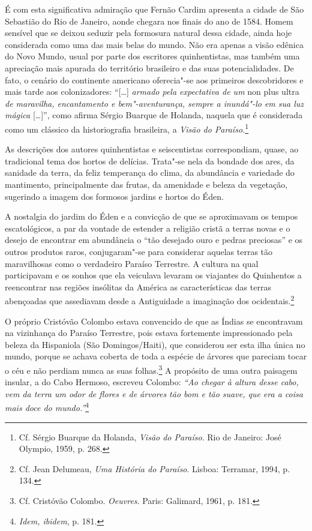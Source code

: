 É com esta significativa admiração que Fernão Cardim
apresenta a cidade de São Sebastião do Rio de Janeiro, aonde chegara nos
finais do ano de 1584. Homem sensível que se deixou seduzir pela
formosura natural dessa cidade, ainda hoje considerada como uma das
mais belas do mundo. Não era apenas a visão edênica do Novo Mundo,
usual por parte dos escritores quinhentistas, mas também uma
apreciação mais apurada do território brasileiro e das suas
potencialidades. De fato, o cenário do continente americano
oferecia"-se aos primeiros descobridores e mais tarde aos
colonizadores: ``[\ldots] \textit{armado pela expectativa de um} non plus ultra \textit{de maravilha, 
encantamento e bem"-aventurança, sempre a inundá"-lo em sua luz mágica} [\ldots]'',
como afirma Sérgio Buarque de Holanda, naquela que
é considerada como um clássico da historiografia brasileira, a
\textit{Visão do Paraíso.}\footnote{ Cf. Sérgio Buarque da Holanda,
\textit{Visão do Paraíso}. Rio de Janeiro: José Olympio, 1959, p. 268.}

As descrições dos autores quinhentistas e seiscentistas
correspondiam, quase, ao tradicional tema dos hortos de delícias.
Trata"-se nela da bondade dos ares, da sanidade da terra, da feliz
temperança do clima, da abundância e variedade do mantimento,
principalmente das frutas, da amenidade e beleza da vegetação,
sugerindo a imagem dos formosos jardins e hortos do Éden.

A nostalgia do jardim do Éden e a convicção de que se aproximavam os
tempos escatológicos, a par da vontade de estender a religião cristã a
terras novas e o desejo de encontrar em abundância o ``tão desejado
ouro e pedras preciosas'' e os outros produtos raros, conjugaram"-se
para considerar aquelas terras tão maravilhosas como o verdadeiro
Paraíso Terrestre. A cultura na qual participavam e os sonhos que ela
veiculava levaram os viajantes do Quinhentos a reencontrar nas regiões
insólitas da América as características das terras abençoadas que
assediavam desde a Antiguidade a imaginação dos ocidentais.\footnote{ Cf. Jean Delumeau, 
\textit{Uma História do Paraíso}. Lisboa: Terramar, 1994, p. 134.} 

 O próprio Cristóvão Colombo estava convencido de que as 
Índias se encontravam na vizinhança do Paraíso Terrestre, pois estava
fortemente impressionado pela beleza da Hispaniola (São
Domingos/Haiti), que considerou ser esta ilha única no mundo, porque se
achava coberta de toda a espécie de árvores que pareciam tocar o céu e
não perdiam nunca as suas folhas.\footnote{ Cf. Cristóvão
Colombo. \textit{Oeuvres}. Paris: Galimard, 1961, p. 181.} A
propósito de uma outra paisagem insular, a do Cabo Hermoso, escreveu
Colombo: \textit{``Ao chegar à altura desse cabo, vem da terra um
odor de flores e de árvores tão bom e tão suave, que era a coisa mais
doce do mundo.''}\footnote{ \textit{Idem, ibidem}, p. 181.} 

